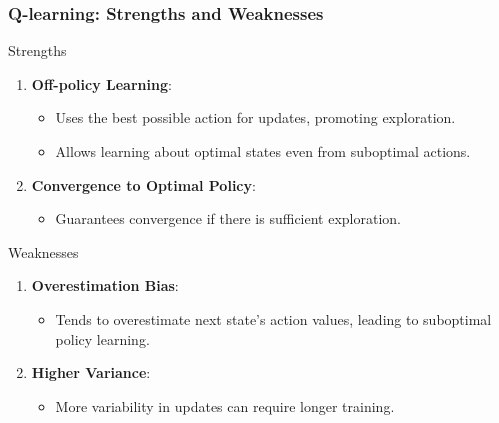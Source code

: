 \documentclass[aspectratio=169]{beamer}
\begin{document}
\begin{frame}[fragile]
    \frametitle{Q-learning: Strengths and Weaknesses}
    \begin{block}{Strengths}
        \begin{enumerate}
            \item \textbf{Off-policy Learning}:
            \begin{itemize}
                \item Uses the best possible action for updates, promoting exploration.
                \item Allows learning about optimal states even from suboptimal actions.
            \end{itemize}
            \item \textbf{Convergence to Optimal Policy}:
            \begin{itemize}
                \item Guarantees convergence if there is sufficient exploration.
            \end{itemize}
        \end{enumerate}
    \end{block}

    \begin{block}{Weaknesses}
        \begin{enumerate}
            \item \textbf{Overestimation Bias}:
            \begin{itemize}
                \item Tends to overestimate next state's action values, leading to suboptimal policy learning.
            \end{itemize}
            \item \textbf{Higher Variance}:
            \begin{itemize}
                \item More variability in updates can require longer training.
            \end{itemize}
        \end{enumerate}
    \end{block}
\end{frame}
\end{document}

